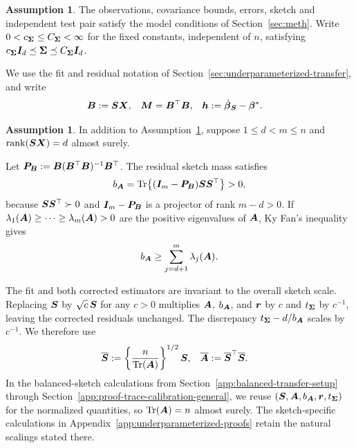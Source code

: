 \documentclass{article}
\theoremstyle{plain} %
\theoremstyle{definition} %
\newtheorem{assumption}[theorem]{Assumption}
\theoremstyle{definition} %
\begin{document}
\begin{assumption}
\label{assu:model-sketch}
The observations, covariance bounds, errors, sketch and independent test
pair satisfy the model conditions of Section~\ref{sec:meth}. Write
$0<c_{\boldsymbol{\Sigma}}\leq C_{\boldsymbol{\Sigma}}<\infty$ for the fixed constants,
independent of $n$, satisfying
$c_{\boldsymbol{\Sigma}}\boldsymbol{I}_d\preceq\boldsymbol{\Sigma}\preceq C_{\boldsymbol{\Sigma}}\boldsymbol{I}_d$.
\end{assumption}
We use the fit and residual notation of
Section~\ref{sec:underparameterized-transfer}, and write
\begin{align*}
    \boldsymbol{B}&:=\boldsymbol{S}\boldsymbol{X},
    &\boldsymbol{M}&=\boldsymbol{B}^\top\boldsymbol{B},
    &\boldsymbol{h}&:=\hat{\boldsymbol{\beta}}{}_{\boldsymbol{S}}-\boldsymbol{\beta}^*.
\end{align*}
\begin{assumption}
\label{assu:noninterpolating}
In addition to Assumption~\ref{assu:model-sketch}, suppose
$1\leq d<m\leq n$ and $\operatorname{rank}(\boldsymbol{S}\boldsymbol{X})=d$ almost surely.
\end{assumption}
Let $\boldsymbol{P}_{\boldsymbol{B}}:=\boldsymbol{B}(\boldsymbol{B}^\top\boldsymbol{B})^{-1}\boldsymbol{B}^\top$.
The residual sketch mass satisfies
\begin{align*}
    b_{\boldsymbol{A}}
    =\operatorname{Tr}\!\left\{(\boldsymbol{I}_m-\boldsymbol{P}_{\boldsymbol{B}})\boldsymbol{S}\boldsymbol{S}^\top\right\}>0,
\end{align*}
because $\boldsymbol{S}\boldsymbol{S}^\top\succ0$ and $\boldsymbol{I}_m-\boldsymbol{P}_{\boldsymbol{B}}$ is a projector
of rank $m-d>0$. If
$\lambda_1(\boldsymbol{A})\geq\cdots\geq\lambda_m(\boldsymbol{A})>0$ are the positive
eigenvalues of $\boldsymbol{A}$, Ky Fan's inequality gives
\begin{align}
    b_{\boldsymbol{A}}\geq\sum_{j=d+1}^{m}\lambda_j(\boldsymbol{A}).
    \label{eq:bA-spectral-lower}
\end{align}

The fit and both corrected estimators are invariant to the overall
sketch scale. Replacing $\boldsymbol{S}$ by $\sqrt c\,\boldsymbol{S}$ for any $c>0$ multiplies
$\boldsymbol{A}$, $b_{\boldsymbol{A}}$, and $\boldsymbol{r}$ by $c$ and $t_{\boldsymbol{\Sigma}}$ by $c^{-1}$,
leaving the corrected residuals unchanged. The discrepancy
$t_{\boldsymbol{\Sigma}}-d/b_{\boldsymbol{A}}$ scales by $c^{-1}$. We therefore use
\begin{align*}
    \overline{\boldsymbol{S}}
    &:=\left\{\frac{n}{\operatorname{Tr}(\boldsymbol{A})}\right\}^{1/2}\boldsymbol{S},
    &\overline{\boldsymbol{A}}&:=\overline{\boldsymbol{S}}^{\top}\overline{\boldsymbol{S}}.
\end{align*}
In the balanced-sketch calculations from
Section~\ref{app:balanced-transfer-setup} through
Section~\ref{app:proof-trace-calibration-general}, we reuse
$(\boldsymbol{S},\boldsymbol{A},b_{\boldsymbol{A}},\boldsymbol{r},t_{\boldsymbol{\Sigma}})$ for the normalized quantities,
so $\operatorname{Tr}(\boldsymbol{A})=n$ almost surely. The sketch-specific calculations in
Appendix~\ref{app:underparameterized-proofs} retain the natural scalings
stated there.
\end{document}
